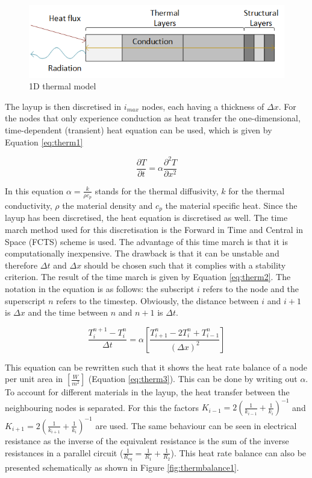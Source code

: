 \begin{figure}[H]
	\centering
	\includegraphics{Figure/1dthermal.png}
	\caption{1D thermal model}
	\label{fig:1dthermal}
\end{figure}

The layup is then discretised in $i_{max}$ nodes, each having a thickness of $\Delta x$. For the nodes that only experience conduction as heat transfer the one-dimensional, time-dependent (transient) heat equation can be used, which is given by Equation \eqref{eq:therm1}

\begin{equation}
\frac{\partial T}{\partial t} = \alpha\frac{\partial^2T}{\partial x^2}
\label{eq:therm1}
\end{equation}

In this equation $\alpha=\frac{k}{\rho c_p}$ stands for the thermal diffusivity, $k$ for the thermal conductivity, $\rho$ the material density and $c_p$ the material specific heat. Since the layup has been discretised, the heat equation is discretised as well. The time march method used for this discretisation is the Forward in Time and Central in Space (FCTS) scheme is used. The advantage of this time march is that it is computationally inexpensive. The drawback is that it can be unstable and therefore $\Delta t$ and $\Delta x$ should be chosen such that it complies with a stability criterion. The result of the time march is given by Equation \eqref{eq:therm2}. The notation in the equation is as follows: the subscript $i$ refers to the node and the superscript $n$ refers to the timestep. Obviously, the distance between $i$ and $i+1$ is $\Delta x$ and the time between $n$ and $n+1$ is $\Delta t$.

\begin{equation}
\frac{T_i^{n+1}-T_i^n}{\Delta t} = \alpha\left[\frac{T_{i+1}^n-2T_i^n+T_{i-1}^n}{\left(\Delta x\right)^2}\right]
\label{eq:therm2}
\end{equation}

This equation can be rewritten such that it shows the heat rate balance of a node per unit area in $\left[\frac{W}{m^2}\right]$ (Equation \eqref{eq:therm3}). This can be done by writing out $\alpha$. To account for different materials in the layup, the heat transfer between the neighbouring nodes is separated. For this the factors $K_{i-1}=2\left(\frac{1}{k_{i-1}}+\frac{1}{k_i}\right)^{-1}$ and $K_{i+1}=2\left(\frac{1}{k_{i+1}}+\frac{1}{k_i}\right)^{-1}$ are used. The same behaviour can be seen in electrical resistance as the inverse of the equivalent resistance is the sum of the inverse resistances in a parallel circuit ($\frac{1}{R_{eq}}=\frac{1}{R_1}+\frac{1}{R_2}$). This heat rate balance can also be presented schematically as shown in Figure \ref{fig:thermbalance1}.

